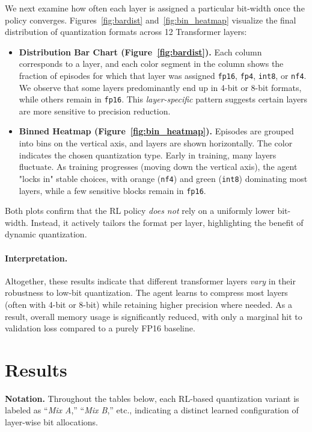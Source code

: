 \documentclass{article}
\begin{document}
	We next examine how often each layer is assigned a particular bit-width once the policy converges. Figures~\ref{fig:bardist} and~\ref{fig:bin_heatmap} visualize the final distribution of quantization formats across 12 Transformer layers:
	\begin{itemize}
		\item \textbf{Distribution Bar Chart (Figure~\ref{fig:bardist}).} Each column corresponds to a layer, and each color segment in the column shows the fraction of episodes for which that layer was assigned \texttt{fp16}, \texttt{fp4}, \texttt{int8}, or \texttt{nf4}. We observe that some layers predominantly end up in 4-bit or 8-bit formats, while others remain in \texttt{fp16}. This \emph{layer-specific} pattern suggests certain layers are more sensitive to precision reduction.
		\item \textbf{Binned Heatmap (Figure~\ref{fig:bin_heatmap}).} Episodes are grouped into bins on the vertical axis, and layers are shown horizontally. The color indicates the chosen quantization type. Early in training, many layers fluctuate. As training progresses (moving down the vertical axis), the agent "locks in" stable choices, with orange (\texttt{nf4}) and green (\texttt{int8}) dominating most layers, while a few sensitive blocks remain in \texttt{fp16}.
	\end{itemize}
	Both plots confirm that the RL policy \emph{does not} rely on a uniformly lower bit-width. Instead, it actively tailors the format per layer, highlighting the benefit of dynamic quantization.
	
	\paragraph{Interpretation.}
	Altogether, these results indicate that different transformer layers \emph{vary} in their robustness to low-bit quantization. The agent learns to compress most layers (often with 4-bit or 8-bit) while retaining higher precision where needed. As a result, overall memory usage is significantly reduced, with only a marginal hit to validation loss compared to a purely FP16 baseline.
			
	
	\section{Results}
	
	\noindent
	\textbf{Notation.} 
	Throughout the tables below, each RL-based quantization variant is labeled as ``\textit{Mix A},'' ``\textit{Mix B},'' etc., indicating a distinct learned configuration of layer-wise bit allocations.
	
\end{document}
